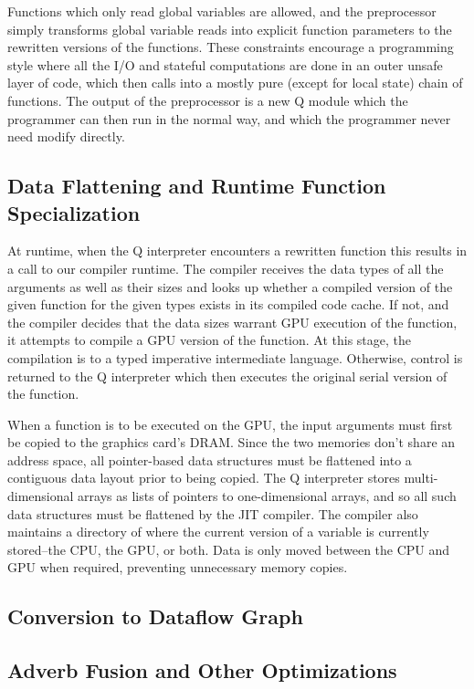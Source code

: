 \documentclass[preprint]{sigplanconf}
\begin{document}
Functions which only read global variables are allowed, and the preprocessor simply transforms global variable reads into explicit function parameters to the rewritten versions of the functions.  These constraints encourage a programming style where all the I/O and stateful computations are done in an outer unsafe layer of code, which then calls into a mostly pure (except for local state) chain of functions.  The output of the preprocessor is a new Q module which the programmer can then run in the normal way, and which the programmer never need modify directly.

\subsection{Data Flattening and Runtime Function Specialization}
At runtime, when the Q interpreter encounters a rewritten function this results in a call to our compiler runtime.  The compiler receives the data types of all the arguments as well as their sizes and looks up whether a compiled version of the given function for the given types exists in its compiled code cache.  If not, and the compiler decides that the data sizes warrant GPU execution of the function, it attempts to compile a GPU version of the function.  At this stage, the compilation is to a typed imperative intermediate language.  Otherwise, control is returned to the Q interpreter which then executes the original serial version of the function.

When a function is to be executed on the GPU, the input arguments must first be copied to the graphics card's DRAM.  Since the two memories don't share an address space, all pointer-based data structures must be flattened into a contiguous data layout prior to being copied.  The Q interpreter stores multi-dimensional arrays as lists of pointers to one-dimensional arrays, and so all such data structures must be flattened by the JIT compiler.  The compiler also maintains a directory of where the current version of a variable is currently stored--the CPU, the GPU, or both.  Data is only moved between the CPU and GPU when required, preventing unnecessary memory copies.

\subsection{Conversion to Dataflow Graph}


\subsection{Adverb Fusion and Other Optimizations}
\end{document}

